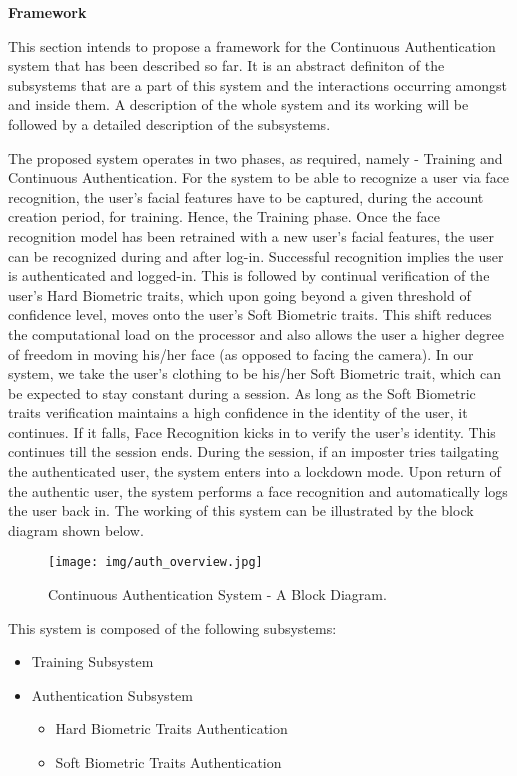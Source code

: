 \documentclass[12pt]{article}			%
\begin{document}

\begin{center}
	{\LARGE \bf Framework}
\end{center}
This section intends to propose a framework for the Continuous Authentication system that has been described so far. It is an abstract definiton of the subsystems that are a part of this system and the interactions occurring amongst and inside them. A description of the whole system and its working will be followed by a detailed description of the subsystems.

The proposed system operates in two phases, as required, namely - Training and Continuous Authentication. For the system to be able to recognize a user via face recognition, the user's facial features have to be captured, during the account creation period, for training. Hence, the Training phase. Once the face recognition model has been retrained with a new user's facial features, the user can be recognized during and after log-in. Successful recognition implies the user is authenticated and logged-in. This is followed by continual verification of the user's Hard Biometric traits, which upon going beyond a given threshold of confidence level, moves onto the user's Soft Biometric traits. This shift reduces the computational load on the processor and also allows the user a higher degree of freedom in moving his/her face (as opposed to facing the camera). In our system, we take the user's clothing to be his/her Soft Biometric trait, which can be expected to stay constant during a session. As long as the Soft Biometric traits verification maintains a high confidence in the identity of the user, it continues. If it falls, Face Recognition kicks in to verify the user's identity. This continues till the session ends. During the session, if an imposter tries tailgating the authenticated user, the system enters into a lockdown mode. Upon return of the authentic user, the system performs a face recognition and automatically logs the user back in. The working of this system can be illustrated by the block diagram shown below. 

\begin{figure}[h!]
        \centering
        \texttt{[image: img/auth\_overview.jpg]}
        \caption{Continuous Authentication System - A Block Diagram.}
        \label{fig:block_diag}
\end{figure}

This system is composed of the following subsystems:
\begin{itemize}
\item Training Subsystem
\item Authentication Subsystem
	\begin{itemize}
	\item Hard Biometric Traits Authentication
	\item Soft Biometric Traits Authentication
	\end{itemize} 
\end{itemize} 
\end{document}
